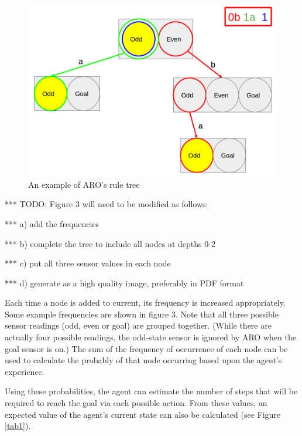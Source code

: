 \documentclass[letterpaper]{article} %
\begin{document}
\begin{figure}[t]
  \centering
  \includegraphics[width=0.9\columnwidth]{RuleTree.png} %
  \caption{An example of ARO's rule tree}
  \label{fig3}
\end{figure}

*** TODO: Figure 3 will need to be modified as follows:

***    a) add the frequencies

***    b) complete the tree to include all nodes at depths 0-2

***    c) put all three sensor values in each node

***    d) generate as a high quality image, preferably in PDF format


Each time a node is added to current, its frequency is increased
appropriately.  Some example frequencies are shown in figure 3.  Note
that all three possible sensor readings (odd, even or goal) are
grouped together.  (While there are actually four possible readings,
the odd-state sensor is ignored by ARO when the goal sensor is on.)
The sum of the frequency of occurrence of each node can be used to
calculate the probably of that node occurring based upon the agent's
experience.

Using these probabilities, the agent can estimate the number of steps
that will be required to reach the goal via each possible action.
From these values, an expected value of the agent's current state can
also be calculated (see Figure \ref{tab1}).

\newcommand\T{\rule{0pt}{2.6ex}}
\newcommand\B{\rule[-1.2ex]{0pt}{0pt}}
\end{document}
